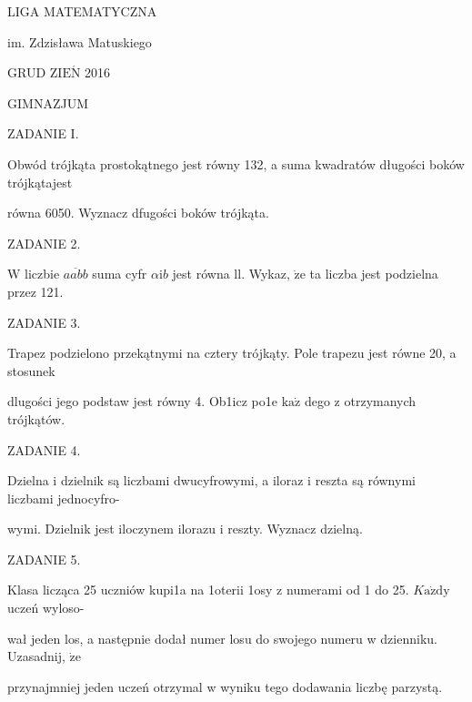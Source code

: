 \documentclass[a4paper,12pt]{article}
\begin{document}
LIGA MATEMATYCZNA

im. Zdzisława Matuskiego

GRUD Z$\mathrm{I}\mathrm{E}\acute{\mathrm{N}}$ 2016

GIMNAZJUM

ZADANIE I.

Obwód trójkąta prostokątnego jest równy 132, a suma kwadratów długości boków trójkątajest

równa 6050. Wyznacz dfugości boków trójkąta.

ZADANIE 2.

$\mathrm{W}$ liczbie $\overline{aabb}$ suma cyfr $\alpha \mathrm{i}b$ jest równa ll. Wykaz, $\dot{\mathrm{z}}\mathrm{e}$ ta liczba jest podzielna przez 121.

ZADANIE 3.

Trapez podzielono przekątnymi na cztery trójkąty. Pole trapezu jest równe 20, a stosunek

dlugości jego podstaw jest równy 4. Ob1icz po1e $\mathrm{k}\mathrm{a}\dot{\mathrm{z}}$ dego z otrzymanych trójkątów.

ZADANIE 4.

Dzielna i dzielnik są liczbami dwucyfrowymi, a iloraz i reszta są równymi liczbami jednocyfro-

wymi. Dzielnik jest iloczynem ilorazu i reszty. Wyznacz dzielną.

ZADANIE 5.

Klasa licząca 25 uczniów kupi1a na 1oterii 1osy z numerami od 1 do 25. $K\mathrm{a}\dot{\mathrm{z}}\mathrm{d}\mathrm{y}$ uczeń wyloso-

wał jeden los, a następnie dodał numer losu do swojego numeru w dzienniku. Uzasadnij, $\dot{\mathrm{z}}\mathrm{e}$

przynajmniej jeden uczeń otrzymal w wyniku tego dodawania liczbę parzystą.
\end{document}
